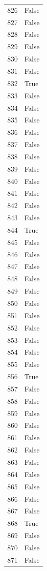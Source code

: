 \documentclass[
  letterpaper,
  DIV=11,
  numbers=noendperiod]{scrreprt}
\begin{document}
\begin{tabular}{ll}
826  &  False \\
827  &  False \\
828  &  False \\
829  &  False \\
830  &  False \\
831  &  False \\
832  &   True \\
833  &  False \\
834  &  False \\
835  &  False \\
836  &  False \\
837  &  False \\
838  &  False \\
839  &  False \\
840  &  False \\
841  &  False \\
842  &  False \\
843  &  False \\
844  &   True \\
845  &  False \\
846  &  False \\
847  &  False \\
848  &  False \\
849  &  False \\
850  &  False \\
851  &  False \\
852  &  False \\
853  &  False \\
854  &  False \\
855  &  False \\
856  &   True \\
857  &  False \\
858  &  False \\
859  &  False \\
860  &  False \\
861  &  False \\
862  &  False \\
863  &  False \\
864  &  False \\
865  &  False \\
866  &  False \\
867  &  False \\
868  &   True \\
869  &  False \\
870  &  False \\
871  &  False \\

\end{tabular}
\end{document}
